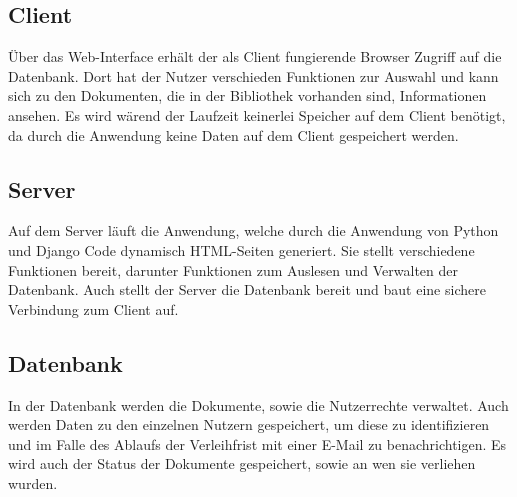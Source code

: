 \subsection{Client}
Über das Web-Interface erhält der als Client fungierende Browser Zugriff 
auf die Datenbank.
Dort hat der Nutzer verschieden Funktionen zur Auswahl und kann sich zu den
Dokumenten, die in der Bibliothek vorhanden sind, Informationen ansehen.
Es wird wärend der Laufzeit keinerlei Speicher auf dem Client benötigt, da 
durch die Anwendung keine Daten auf dem Client gespeichert werden.

\subsection{Server}
Auf dem Server läuft die Anwendung, welche durch die Anwendung von Python und 
Django Code dynamisch HTML-Seiten generiert.
Sie stellt verschiedene Funktionen bereit, darunter Funktionen zum Auslesen 
und Verwalten der Datenbank. 
Auch stellt der Server die Datenbank bereit und baut eine sichere Verbindung 
zum Client auf.

\subsection{Datenbank}
In der Datenbank werden die Dokumente, sowie die Nutzerrechte verwaltet.
Auch werden Daten zu den einzelnen Nutzern gespeichert, um diese zu 
identifizieren und im Falle des Ablaufs der Verleihfrist mit einer E-Mail 
zu benachrichtigen.
Es wird auch der Status der Dokumente gespeichert, sowie an wen sie verliehen
wurden.
